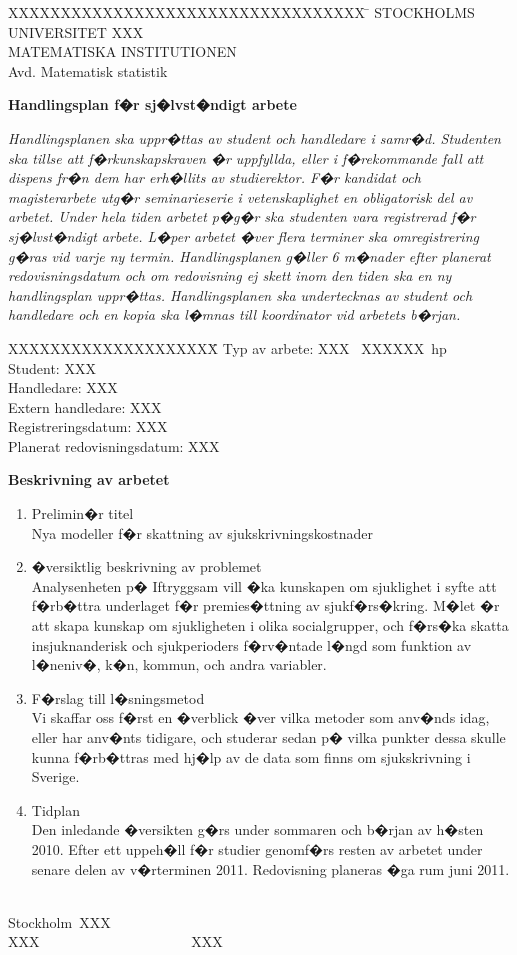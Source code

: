 \documentclass[11pt,a4paper]{article}
\newcommand{\niva}{XXX}                      %
\newcommand{\program}{XXX}    %
\newcommand{\hp}{XXX}                            %
\newcommand{\datum}{XXX}               %
\newcommand{\student}{XXX}           %
\newcommand{\handledare}{XXX}      %
\newcommand{\exthandledare}{XXX}                 %
\newcommand{\registreringsdatum}{XXX}     %
\newcommand{\redovisningsdatum}{XXX}         %
\newcommand{\beskr}{
\begin{enumerate}
\item Prelimin�r titel\\
Nya modeller f�r skattning av sjukskrivningskostnader 
\item �versiktlig beskrivning av problemet \\
Analysenheten p� Iftryggsam vill �ka kunskapen om sjuklighet i syfte att f�rb�ttra underlaget f�r
premies�ttning av sjukf�rs�kring. M�let �r att skapa kunskap om sjukligheten i olika socialgrupper,
och f�rs�ka skatta insjuknanderisk och sjukperioders f�rv�ntade l�ngd som funktion av l�neniv�,
k�n, kommun, och andra variabler.
\item F�rslag till l�sningsmetod \\
Vi skaffar oss f�rst en �verblick �ver vilka metoder som anv�nds idag, eller har anv�nts tidigare,
och studerar sedan p� vilka punkter dessa skulle kunna f�rb�ttras med hj�lp av de data som finns
om sjukskrivning i Sverige.
\item Tidplan \\
Den inledande �versikten g�rs under sommaren och b�rjan av h�sten 2010. Efter ett uppeh�ll f�r
studier genomf�rs resten av arbetet under senare delen av v�rterminen 2011. Redovisning planeras
�ga rum juni 2011.
\\ \\
\end{enumerate}
}
\begin{document}
 
\begin{tabbing}
XXXXXXXXXXXXXXXXXXXXXXXXXXXXXXXXXX \=       \kill
STOCKHOLMS UNIVERSITET	     \> \datum       \\
MATEMATISKA INSTITUTIONEN     \\
Avd. Matematisk statistik     \\
\end{tabbing}
\medskip
\begin{center} \large \textbf {Handlingsplan f�r sj�lvst�ndigt arbete} \end{center} 
\textit{ \small Handlingsplanen ska uppr�ttas av student och handledare i samr�d. Studenten ska tillse att f�rkunskapskraven �r uppfyllda, eller i f�rekommande fall att dispens fr�n dem har erh�llits av studierektor. F�r kandidat och magisterarbete utg�r seminarieserie i vetenskaplighet en obligatorisk del av arbetet. Under hela tiden arbetet p�g�r ska studenten vara registrerad f�r sj�lvst�ndigt arbete. L�per arbetet �ver flera terminer ska omregistrering g�ras vid varje ny termin.  Handlingsplanen g�ller 6 m�nader efter planerat redovisningsdatum och om redovisning ej skett inom den tiden ska en ny handlingsplan uppr�ttas. Handlingsplanen ska undertecknas av student och handledare och en kopia ska l�mnas till koordinator vid arbetets b�rjan.} \\
\begin{normalsize}
\medskip
\begin{tabbing}
XXXXXXXXXXXXXXXXXXXX\=       \kill
Typ av arbete:  \>   \niva~ \program   \hp ~hp     \\
Student:     \> \student      \\
Handledare:  \> \handledare \\
Extern handledare: \> \exthandledare \\
Registreringsdatum: \> \registreringsdatum \\
Planerat redovisningsdatum: \> \redovisningsdatum  \\
\end{tabbing} 
\textbf{Beskrivning av arbetet}
\medskip
\beskr 
Stockholm\ \datum \\[30 mm]
\student     ~~~~~~~~~~~~~~~~~~~~~    \handledare

\end{normalsize}
\end{document}
